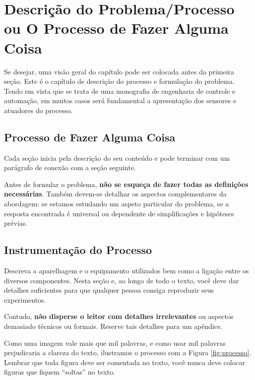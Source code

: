 \chapter[Descrição do Processo]{Descrição do Problema/Processo ou O Processo de Fazer Alguma Coisa}
\label{chap:descricaoproblema}

Se desejar, uma visão geral do capítulo pode ser colocada antes da primeira seção. Este é o capítulo de descrição do processo e formulação do problema. Tendo em vista que se trata de uma monografia de engenharia de controle e automação, em muitos casos será fundamental a apresentação dos sensores e atuadores do processo.


\section{Processo de Fazer Alguma Coisa}
\label{sec:hist}

Cada seção inicia pela descrição do seu conteúdo e pode terminar com um parágrafo de conexão com a seção seguinte. 

Antes de formular o problema, \textbf{não se esqueça de fazer todas as definições necessárias}. Também devem-se detalhar os aspectos complementares da abordagem: se estamos estudando um aspeto particular do problema, se a resposta encontrada é universal ou dependente de simplificações e hipóteses prévias.


\section{Instrumentação do Processo}
\label{sec:instrumentação}

Descreva a aparelhagem e o equipamento utilizados bem como a ligação entre os diversos componentes. Nesta seção e, ao longo de todo o texto, você deve dar detalhes suficientes para que qualquer pessoa consiga reproduzir seus experimentos.

Contudo, \textbf{não disperse o leitor com detalhes irrelevantes} ou aspectos
demasiado técnicos ou formais. Reserve tais detalhes para um
apêndice.

Como uma imagem vale mais que mil palavras, e como usar mil palavras prejudicaria a clareza do texto, ilustramos o processo com a Figura \ref{fig:processo}. Lembrar que toda figura deve ser comentada no texto, você nunca deve colocar figuras que fiquem ``soltas'' no texto.  

